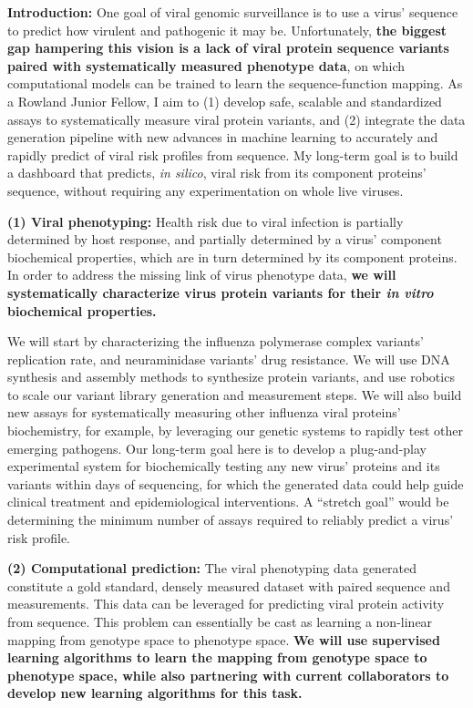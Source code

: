 \textbf{Introduction:} One goal of viral genomic surveillance is to use
a virus' sequence to predict how virulent and pathogenic it may be.
Unfortunately, \textbf{the biggest gap hampering this vision is a lack
of viral protein sequence variants paired with systematically measured
phenotype data}, on which computational models can be trained to learn
the sequence-function mapping. As a Rowland Junior Fellow, I aim to (1)
develop safe, scalable and standardized assays to systematically measure
viral protein variants, and (2) integrate the data generation pipeline
with new advances in machine learning to accurately and rapidly predict
of viral risk profiles from sequence. My long-term goal is to build a
dashboard that predicts, \emph{in silico}, viral risk from its component
proteins' sequence, without requiring any experimentation on whole live
viruses.

\textbf{(1) Viral phenotyping:} Health risk due to viral infection is
partially determined by host response, and partially determined by a
virus' component biochemical properties, which are in turn determined by
its component proteins. In order to address the missing link of virus
phenotype data, \textbf{we will systematically characterize virus
protein variants for their \emph{in vitro} biochemical properties.}

We will start by characterizing the influenza polymerase complex
variants' replication rate, and neuraminidase variants' drug resistance.
We will use DNA synthesis and assembly methods to synthesize protein
variants, and use robotics to scale our variant library generation and
measurement steps. We will also build new assays for systematically
measuring other influenza viral proteins' biochemistry, for example, by
leveraging our genetic systems to rapidly test other emerging pathogens.
Our long-term goal here is to develop a plug-and-play experimental
system for biochemically testing any new virus' proteins and its
variants within days of sequencing, for which the generated data could
help guide clinical treatment and epidemiological interventions. A
``stretch goal'' would be determining the minimum number of assays
required to reliably predict a virus' risk profile.

\textbf{(2) Computational prediction:} The viral phenotyping data
generated constitute a gold standard, densely measured dataset with
paired sequence and measurements. This data can be leveraged for
predicting viral protein activity from sequence. This problem can
essentially be cast as learning a non-linear mapping from genotype space
to phenotype space. \textbf{We will use supervised learning algorithms
to learn the mapping from genotype space to phenotype space, while also
partnering with current collaborators to develop new learning algorithms
for this task.}

